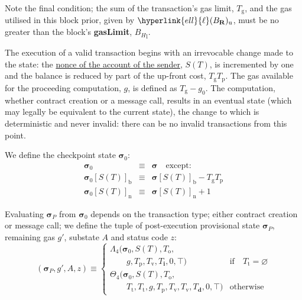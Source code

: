 \documentclass[9pt,oneside]{amsart}
\begin{document}
\begin{multicols}{2}
Note the final condition; the sum of the transaction's gas limit, $T_{\mathrm{g}}$, and the gas utilised in this block prior, given by $\hyperlink{ell}{\ell}(B_{\mathbf{R}})_{\mathrm{u}}$, must be no greater than the block's \textbf{gasLimit}, ${B_{H}}_{\mathrm{l}}$.

The execution of a valid transaction begins with an irrevocable change made to the state: the \hyperlink{account_nonce}{nonce of the account of the sender}, $S(T)$, is incremented by one and the balance is reduced by part of the up-front cost, $T_{\mathrm{g}}T_{\mathrm{p}}$. The gas available for the proceeding computation, $g$, is defined as $T_{\mathrm{g}} - g_0$. The computation, whether contract creation or a message call, results in an eventual state (which may legally be equivalent to the current state), the change to which is deterministic and never invalid: there can be no invalid transactions from this point.

We define the checkpoint state $\boldsymbol{\sigma}_0$:
\begin{eqnarray}
\boldsymbol{\sigma}_0 & \equiv & \boldsymbol{\sigma} \quad \text{except:} \\
\boldsymbol{\sigma}_0[S(T)]_{\mathrm{b}} & \equiv & \boldsymbol{\sigma}[S(T)]_{\mathrm{b}} - T_{\mathrm{g}} T_{\mathrm{p}} \\
\boldsymbol{\sigma}_0[S(T)]_{\mathrm{n}} & \equiv & \boldsymbol{\sigma}[S(T)]_{\mathrm{n}} + 1
\end{eqnarray}

Evaluating $\boldsymbol{\sigma}_{P}$ from $\boldsymbol{\sigma}_0$ depends on the transaction type; either contract creation or message call; we define the tuple of post-execution provisional state $\boldsymbol{\sigma}_{P}$, remaining gas $g'$, substate $A$ and status code $z$:
\begin{equation}
(\boldsymbol{\sigma}_{P}, g', A, z) \equiv \begin{cases}
\Lambda_{4}(\boldsymbol{\sigma}_0, S(T), T_{\mathrm{o}}, &\\ \quad\quad g, T_{\mathrm{p}}, T_{\mathrm{v}}, T_{\mathbf{i}}, 0, \top) & \text{if} \quad T_{\mathrm{t}} = \varnothing \\
\Theta_{4}(\boldsymbol{\sigma}_0, S(T), T_{\mathrm{o}}, &\\ \quad\quad T_{\mathrm{t}}, T_{\mathrm{t}}, g, T_{\mathrm{p}}, T_{\mathrm{v}}, T_{\mathrm{v}}, T_{\mathbf{d}}, 0, \top) & \text{otherwise}
\end{cases}
\end{equation}


\end{multicols}
\end{document}
